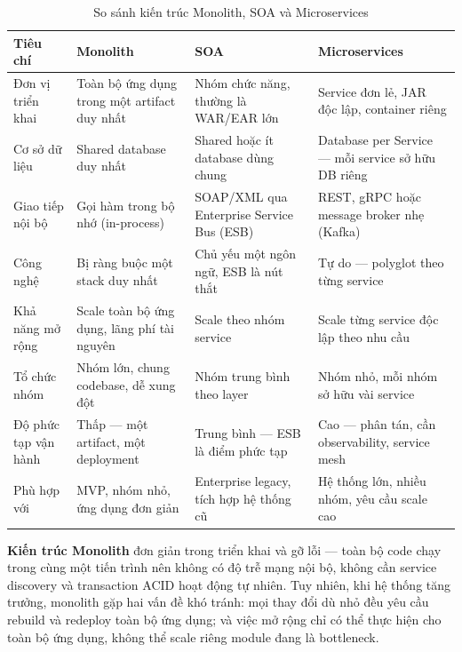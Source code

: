 \documentclass[../DoAn.tex]{subfiles}
\begin{document}
\begin{table}[H]
\centering
\caption{So sánh kiến trúc Monolith, SOA và Microservices}
\label{table:arch-comparison}
\begin{compacttable}
\begin{tabularx}{\textwidth}{|L{3.2cm}|Y|Y|Y|}
\hline
\textbf{Tiêu chí} & \textbf{Monolith} & \textbf{SOA} & \textbf{Microservices} \\ \hline
Đơn vị triển khai
    & Toàn bộ ứng dụng trong một artifact duy nhất
    & Nhóm chức năng, thường là WAR/EAR lớn
    & Service đơn lẻ, JAR độc lập, container riêng \\ \hline
Cơ sở dữ liệu
    & Shared database duy nhất
    & Shared hoặc ít database dùng chung
    & Database per Service --- mỗi service sở hữu DB riêng \\ \hline
Giao tiếp nội bộ
    & Gọi hàm trong bộ nhớ (in-process)
    & SOAP/XML qua Enterprise Service Bus (ESB)
    & REST, gRPC hoặc message broker nhẹ (Kafka) \\ \hline
Công nghệ
    & Bị ràng buộc một stack duy nhất
    & Chủ yếu một ngôn ngữ, ESB là nút thắt
    & Tự do --- polyglot theo từng service \\ \hline
Khả năng mở rộng
    & Scale toàn bộ ứng dụng, lãng phí tài nguyên
    & Scale theo nhóm service
    & Scale từng service độc lập theo nhu cầu \\ \hline
Tổ chức nhóm
    & Nhóm lớn, chung codebase, dễ xung đột
    & Nhóm trung bình theo layer
    & Nhóm nhỏ, mỗi nhóm sở hữu vài service \\ \hline
Độ phức tạp vận hành
    & Thấp --- một artifact, một deployment
    & Trung bình --- ESB là điểm phức tạp
    & Cao --- phân tán, cần observability, service mesh \\ \hline
Phù hợp với
    & MVP, nhóm nhỏ, ứng dụng đơn giản
    & Enterprise legacy, tích hợp hệ thống cũ
    & Hệ thống lớn, nhiều nhóm, yêu cầu scale cao \\ \hline
\end{tabularx}
\end{compacttable}
\end{table}

\textbf{Kiến trúc Monolith} đơn giản trong triển khai và gỡ lỗi --- toàn bộ code chạy
trong cùng một tiến trình nên không có độ trễ mạng nội bộ, không cần service discovery và
transaction ACID hoạt động tự nhiên. Tuy nhiên, khi hệ thống tăng trưởng, monolith gặp hai
vấn đề khó tránh: mọi thay đổi dù nhỏ đều yêu cầu rebuild và redeploy toàn bộ ứng dụng; và
việc mở rộng chỉ có thể thực hiện cho toàn bộ ứng dụng, không thể scale riêng module đang
là bottleneck.
\end{document}
